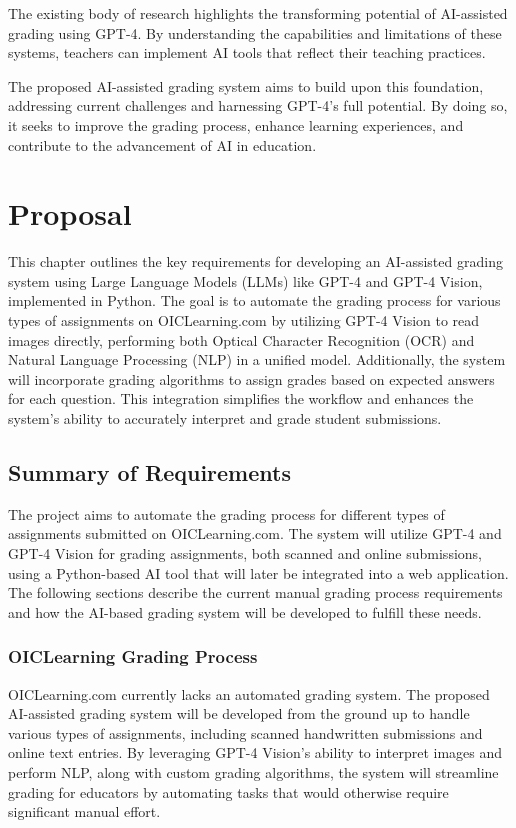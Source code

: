 \documentclass[ms,twoside,print]{nuthesis}
\begin{document}
The existing body of research highlights the transforming potential of AI-assisted grading using GPT-4. By understanding the capabilities and limitations of these systems, teachers can implement AI tools that reflect their teaching practices.

The proposed AI-assisted grading system aims to build upon this foundation, addressing current challenges and harnessing GPT-4's full potential. By doing so, it seeks to improve the grading process, enhance learning experiences, and contribute to the advancement of AI in education.

\chapter{Proposal}

This chapter outlines the key requirements for developing an AI-assisted grading system using Large Language Models (LLMs) like GPT-4 and GPT-4 Vision, implemented in Python. The goal is to automate the grading process for various types of assignments on OICLearning.com by utilizing GPT-4 Vision to read images directly, performing both Optical Character Recognition (OCR) and Natural Language Processing (NLP) in a unified model. Additionally, the system will incorporate grading algorithms to assign grades based on expected answers for each question. This integration simplifies the workflow and enhances the system's ability to accurately interpret and grade student submissions.

\section{Summary of Requirements}

The project aims to automate the grading process for different types of assignments submitted on OICLearning.com. The system will utilize GPT-4 and GPT-4 Vision for grading assignments, both scanned and online submissions, using a Python-based AI tool that will later be integrated into a web application. The following sections describe the current manual grading process requirements and how the AI-based grading system will be developed to fulfill these needs.

\subsection{OICLearning Grading Process}

OICLearning.com currently lacks an automated grading system. The proposed AI-assisted grading system will be developed from the ground up to handle various types of assignments, including scanned handwritten submissions and online text entries. By leveraging GPT-4 Vision's ability to interpret images and perform NLP, along with custom grading algorithms, the system will streamline grading for educators by automating tasks that would otherwise require significant manual effort.
\end{document}
